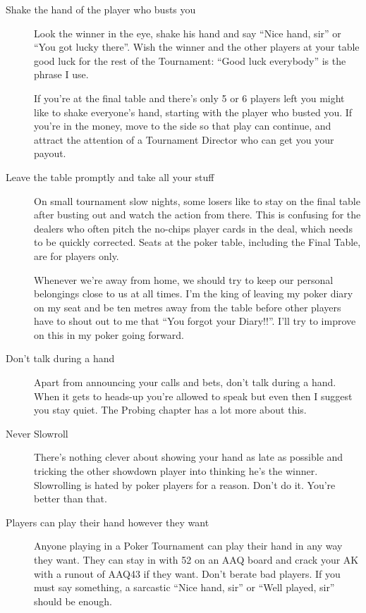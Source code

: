 \begin{description}

\item[Shake the hand of the player who busts you] Look the winner in the
eye, shake his hand and say ``Nice hand, sir'' or ``You got lucky there''.
Wish the winner and the other players at your table good luck for the
rest of the Tournament: ``Good luck everybody'' is the phrase I use.

If you're at the final table and there's only 5 or 6 players left you
might like to shake everyone's hand, starting with the player who
busted you. If you're in the money, move to the side so that play
can continue, and attract the attention of a Tournament Director who
can get you your payout.

\item[Leave the table promptly and take all your stuff] On small
tournament slow nights, some losers like to stay on the final table
after busting out and watch the action from there. This is confusing
for the dealers who often pitch the no-chips player cards in the deal,
which needs to be quickly corrected. Seats at the poker table,
including the Final Table, are for players only.

Whenever we're away from home, we should try to keep our personal
belongings close to us at all times. I'm the king of leaving my poker
diary on my seat and be ten metres away from the table before other
players have to shout out to me that ``You forgot your Diary!!''. I'll
try to improve on this in my poker going forward.

\item[Don't talk during a hand] Apart from announcing your calls and
bets, don't talk during a hand. When it gets to heads-up you're
allowed to speak but even then I suggest you stay quiet. The Probing
chapter has a lot more about this.

\item[Never Slowroll]  There's nothing clever about showing your hand
as late as possible and tricking the other showdown player into thinking
he's the winner. Slowrolling is hated by poker players for a
reason.
Don't do it. You're better than that.


\item[Players can play their hand however they want] Anyone playing in
a Poker Tournament can play their hand in any way they want. They
can stay in with 52 on an AAQ board and crack your AK with a runout
of AAQ43 if they want. Don't berate bad players. If you must say
something, a sarcastic ``Nice hand, sir'' or ``Well played, sir'' should
be enough.


\end{description}
